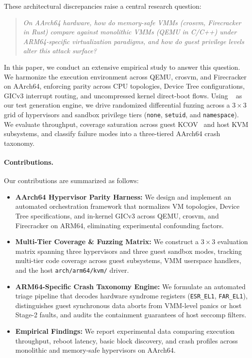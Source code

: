 \documentclass{article}
\begin{document}
These architectural discrepancies raise a central research question:
\begin{quote}
\emph{On AArch64 hardware, how do memory-safe VMMs (crosvm, Firecracker in Rust) compare against monolithic VMMs (QEMU in C/C++) under ARM64-specific virtualization paradigms, and how do guest privilege levels alter this attack surface?}
\end{quote}

In this paper, we conduct an extensive empirical study to answer this question. We harmonize the execution environment across QEMU, crosvm, and Firecracker on AArch64, enforcing parity across CPU topologies, Device Tree configurations, GICv3 interrupt routing, and uncompressed kernel direct-boot flows. Using \syzkaller~\cite{vyukov2015syzkaller} as our test generation engine, we drive randomized differential fuzzing across a $3 \times 3$ grid of hypervisors and sandbox privilege tiers (\texttt{none}, \texttt{setuid}, and \texttt{namespace}). We evaluate throughput, coverage saturation across guest KCOV~\cite{vyukov2016kcov} and host KVM subsystems, and classify failure modes into a three-tiered AArch64 crash taxonomy.

\paragraph{Contributions.}
Our contributions are summarized as follows:
\begin{itemize}[leftmargin=*]
    \item \textbf{AArch64 Hypervisor Parity Harness:} We design and implement an automated orchestration framework that normalizes VM topologies, Device Tree specifications, and in-kernel GICv3 across QEMU, crosvm, and Firecracker on ARM64, eliminating experimental confounding factors.
    \item \textbf{Multi-Tier Coverage \& Fuzzing Matrix:} We construct a $3 \times 3$ evaluation matrix spanning three hypervisors and three guest sandbox modes, tracking multi-tier code coverage across guest subsystems, VMM userspace handlers, and the host \texttt{arch/arm64/kvm/} driver.
    \item \textbf{ARM64-Specific Crash Taxonomy Engine:} We formulate an automated triage pipeline that decodes hardware syndrome registers (\texttt{ESR\_EL1}, \texttt{FAR\_EL1}), distinguishes guest synchronous data aborts from VMM-level panics or host Stage-2 faults, and audits the containment guarantees of host seccomp filters.
    \item \textbf{Empirical Findings:} We report experimental data comparing execution throughput, reboot latency, basic block discovery, and crash profiles across monolithic and memory-safe hypervisors on AArch64.
\end{itemize}
\end{document}
